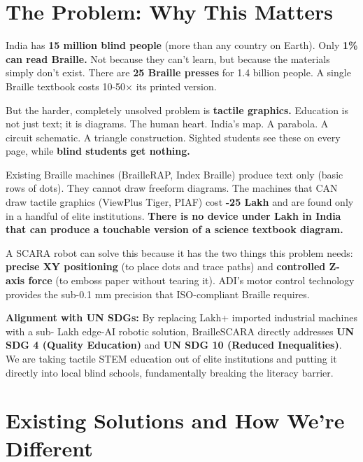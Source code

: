 \documentclass[11pt,a4paper]{article}
\begin{document}
\section{The Problem: Why This Matters}

India has \textbf{15 million blind people} (more than any country on Earth). Only \textbf{1\% can read Braille.} Not because they can't learn, but because the materials simply don't exist. 
There are \textbf{25 Braille presses} for 1.4 billion people. A single Braille textbook costs 10-50$\times$ its printed version. 

But the harder, completely unsolved problem is \textbf{tactile graphics.} Education is not just text; it is diagrams. The human heart. India's map. A parabola. A circuit schematic. A triangle construction. Sighted students see these on every page, while \textbf{blind students get nothing.}

Existing Braille machines (BrailleRAP, Index Braille) produce text only (basic rows of dots). They cannot draw freeform diagrams. The machines that CAN draw tactile graphics (ViewPlus Tiger, PIAF) cost \textbf{-25 Lakh} and are found only in a handful of elite institutions. \textbf{There is no device under  Lakh in India that can produce a touchable version of a science textbook diagram.}

A SCARA robot can solve this because it has the two things this problem needs: \textbf{precise XY positioning} (to place dots and trace paths) and \textbf{controlled Z-axis force} (to emboss paper without tearing it). ADI's motor control technology provides the sub-0.1 mm precision that ISO-compliant Braille requires.

\vspace{0.5em}
\textbf{Alignment with UN SDGs:} By replacing  Lakh+ imported industrial machines with a sub- Lakh edge-AI robotic solution, BrailleSCARA directly addresses \textbf{UN SDG 4 (Quality Education)} and \textbf{UN SDG 10 (Reduced Inequalities)}. We are taking tactile STEM education out of elite institutions and putting it directly into local blind schools, fundamentally breaking the literacy barrier.

\section{Existing Solutions and How We're Different}
\end{document}
